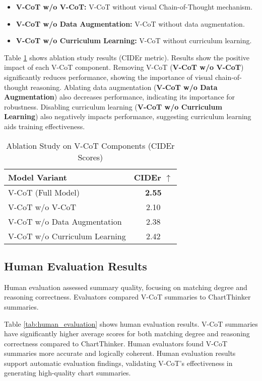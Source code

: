 \begin{itemize}
    \item \textbf{V-CoT w/o V-CoT:}  V-CoT without visual Chain-of-Thought mechanism.
    \item \textbf{V-CoT w/o Data Augmentation:} V-CoT without data augmentation.
    \item \textbf{V-CoT w/o Curriculum Learning:} V-CoT without curriculum learning.
\end{itemize}

Table \ref{tab:ablation_study} shows ablation study results (CIDEr metric). Results show the positive impact of each V-CoT component. Removing V-CoT (\textbf{V-CoT w/o V-CoT}) significantly reduces performance, showing the importance of visual chain-of-thought reasoning. Ablating data augmentation (\textbf{V-CoT w/o Data Augmentation}) also decreases performance, indicating its importance for robustness. Disabling curriculum learning (\textbf{V-CoT w/o Curriculum Learning}) also negatively impacts performance, suggesting curriculum learning aids training effectiveness.

\begin{table}[!t]\small
    \centering
    \caption{Ablation Study on V-CoT Components (CIDEr Scores)}
    \begin{tabular}{lc}
        \toprule
        Model Variant & CIDEr $\uparrow$ \\
        \midrule
        V-CoT (Full Model) & \textbf{2.55} \\
        V-CoT w/o V-CoT & 2.10 \\
        V-CoT w/o Data Augmentation & 2.38 \\
        V-CoT w/o Curriculum Learning & 2.42 \\
        \bottomrule
    \end{tabular}
    \label{tab:ablation_study}
\end{table}


\subsection{Human Evaluation Results}

Human evaluation assessed summary quality, focusing on matching degree and reasoning correctness. Evaluators compared V-CoT summaries to ChartThinker summaries.

Table \ref{tab:human_evaluation} shows human evaluation results. V-CoT summaries have significantly higher average scores for both matching degree and reasoning correctness compared to ChartThinker. Human evaluators found V-CoT summaries more accurate and logically coherent. Human evaluation results support automatic evaluation findings, validating V-CoT's effectiveness in generating high-quality chart summaries.

